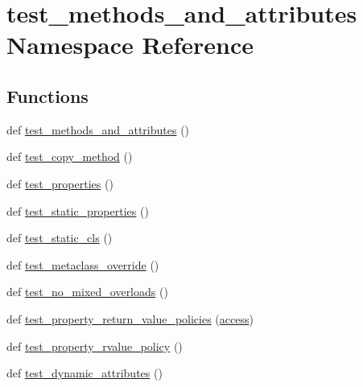 \hypertarget{namespacetest__methods__and__attributes}{}\section{test\+\_\+methods\+\_\+and\+\_\+attributes Namespace Reference}
\label{namespacetest__methods__and__attributes}
\subsection*{Functions}
\begin{DoxyCompactItemize}
\item 
def \mbox{\hyperlink{namespacetest__methods__and__attributes_ac345acc11476895bcb3bff6a776489f3}{test\+\_\+methods\+\_\+and\+\_\+attributes}} ()
\item 
def \mbox{\hyperlink{namespacetest__methods__and__attributes_a0a77d6c9b4e9db580cbe4c378ac8c5db}{test\+\_\+copy\+\_\+method}} ()
\item 
def \mbox{\hyperlink{namespacetest__methods__and__attributes_ae83a31ed758416100b6f5ad0aaa3e5d1}{test\+\_\+properties}} ()
\item 
def \mbox{\hyperlink{namespacetest__methods__and__attributes_a7631bd9712b84ef7b6bb9515fa3805ff}{test\+\_\+static\+\_\+properties}} ()
\item 
def \mbox{\hyperlink{namespacetest__methods__and__attributes_a73e2f8813e4d8a3f04ae6cbaa0e94f59}{test\+\_\+static\+\_\+cls}} ()
\item 
def \mbox{\hyperlink{namespacetest__methods__and__attributes_a15fed28f0cd9634faf04e0816893c3a9}{test\+\_\+metaclass\+\_\+override}} ()
\item 
def \mbox{\hyperlink{namespacetest__methods__and__attributes_a1f8aceafbf22eb66dab505c8386d89d0}{test\+\_\+no\+\_\+mixed\+\_\+overloads}} ()
\item 
def \mbox{\hyperlink{namespacetest__methods__and__attributes_ac1bf4e8ed9dab19d78a31872ac10c406}{test\+\_\+property\+\_\+return\+\_\+value\+\_\+policies}} (\mbox{\hyperlink{_s_d_l__opengl__glext_8h_a9fb81ef401f3cb865f7b2f1bb059f7d7}{access}})
\item 
def \mbox{\hyperlink{namespacetest__methods__and__attributes_a913ba5c97f0b4d0d54a39fe9b7f1847a}{test\+\_\+property\+\_\+rvalue\+\_\+policy}} ()
\item 
def \mbox{\hyperlink{namespacetest__methods__and__attributes_acdcf26390e4ea57e76566c673689656a}{test\+\_\+dynamic\+\_\+attributes}} ()
\item 

\end{DoxyCompactItemize}
